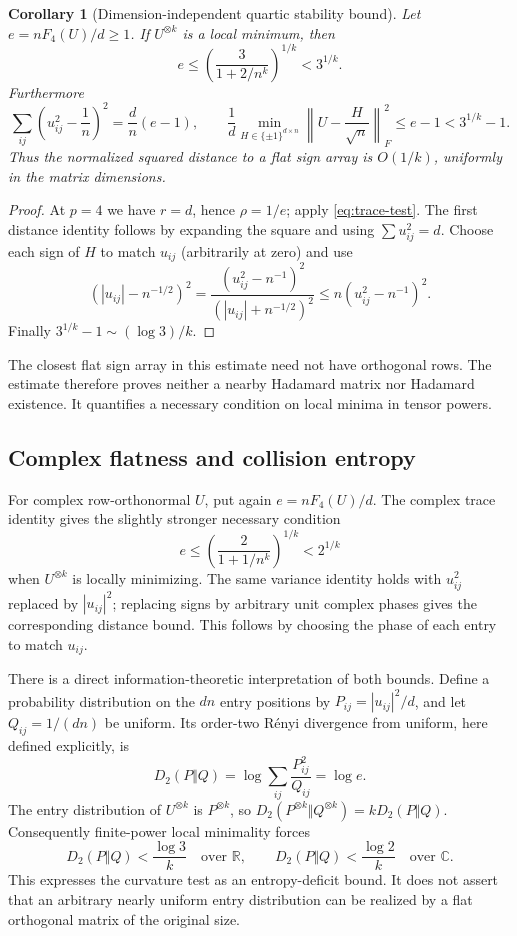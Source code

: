 \documentclass[11pt]{article}
\newtheorem{corollary}[theorem]{Corollary}
\begin{document}
\begin{corollary}[Dimension-independent quartic stability bound]
\label{cor:quartic-rate}
Let $e=nF_4(U)/d\ge1$. If $U^{\otimes k}$ is a local minimum, then
\[
 e\le \left(\frac{3}{1+2/n^k}\right)^{1/k}<3^{1/k}.
\]
Furthermore
\[
 \sum_{ij}\left(u_{ij}^2-\frac1n\right)^2
      =\frac dn(e-1),\qquad
 \frac1d\min_{H\in\{\pm1\}^{d\times n}}
       \left\|U-\frac H{\sqrt n}\right\|_F^2
      \le e-1<3^{1/k}-1.
\]
Thus the normalized squared distance to a flat sign array is
$O(1/k)$, uniformly in the matrix dimensions.
\end{corollary}

\begin{proof}
At $p=4$ we have $r=d$, hence $\rho=1/e$; apply
\eqref{eq:trace-test}. The first distance identity follows by expanding
the square and using $\sum u_{ij}^2=d$. Choose each sign of $H$ to
match $u_{ij}$ (arbitrarily at zero) and use
\[
 (|u_{ij}|-n^{-1/2})^2
 =\frac{(u_{ij}^2-n^{-1})^2}{(|u_{ij}|+n^{-1/2})^2}
 \le n(u_{ij}^2-n^{-1})^2.
\]
Finally $3^{1/k}-1\sim(\log3)/k$.
\end{proof}

The closest flat sign array in this estimate need not have orthogonal
rows. The estimate therefore proves neither a nearby Hadamard matrix
nor Hadamard existence. It quantifies a necessary condition on local
minima in tensor powers.

\subsection{Complex flatness and collision entropy}
For complex row-orthonormal $U$, put again $e=nF_4(U)/d$. The complex
trace identity gives the slightly stronger necessary condition
\[
 e\le\left(\frac{2}{1+1/n^k}\right)^{1/k}<2^{1/k}
\]
when $U^{\otimes k}$ is locally minimizing. The same variance identity
holds with $u_{ij}^2$ replaced by $|u_{ij}|^2$; replacing signs by
arbitrary unit complex phases gives the corresponding distance bound.
This follows by choosing the phase of each entry to match $u_{ij}$.

There is a direct information-theoretic interpretation of both bounds.
Define a probability distribution on the $dn$ entry positions by
$P_{ij}=|u_{ij}|^2/d$, and let $Q_{ij}=1/(dn)$ be uniform. Its
order-two R\'enyi divergence from uniform, here defined explicitly, is
\[
 D_2(P\Vert Q)=\log\sum_{ij}\frac{P_{ij}^2}{Q_{ij}}
             =\log e.
\]
The entry distribution of $U^{\otimes k}$ is $P^{\otimes k}$, so
$D_2(P^{\otimes k}\Vert Q^{\otimes k})=kD_2(P\Vert Q)$.
Consequently finite-power local minimality forces
\[
 D_2(P\Vert Q)<\frac{\log3}{k}\quad\text{over }\mathbb R,
 \qquad
 D_2(P\Vert Q)<\frac{\log2}{k}\quad\text{over }\mathbb C.
\]
This expresses the curvature test as an entropy-deficit bound. It
does not assert that an arbitrary nearly uniform entry distribution
can be realized by a flat orthogonal matrix of the original size.
\end{document}
